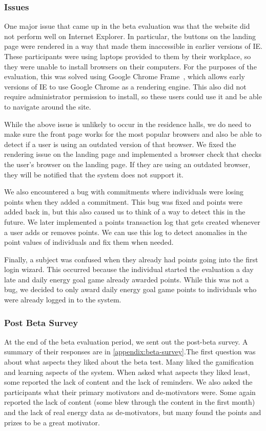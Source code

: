 \subsubsection{Issues}

One major issue that came up in the beta evaluation was that the website did not perform well on Internet Explorer. In particular, the buttons on the landing page were rendered in a way that made them inaccessible in earlier versions of IE. These participants were using laptops provided to them by their workplace, so they were unable to install browsers on their computers. For the purposes of the evaluation, this was solved using Google Chrome Frame~\cite{google-chrome-frame}, which allows early versions of IE to use Google Chrome as a rendering engine. This also did not require administrator permission to install, so these users could use it and be able to navigate around the site. 

While the above issue is unlikely to occur in the residence halls, we do need to make sure the front page works for the most popular browsers and also be able to detect if a user is using an outdated version of that browser. We fixed the rendering issue on the landing page and implemented a browser check that checks the user's browser on the landing page. If they are using an outdated browser, they will be notified that the system does not support it.

We also encountered a bug with commitments where individuals were losing points when they added a commitment. This bug was fixed and points were added back in, but this also caused us to think of a way to detect this in the future. We later implemented a points transaction log that gets created whenever a user adds or removes points. We can use this log to detect anomalies in the point values of individuals and fix them when needed.

Finally, a subject was confused when they already had points going into the first login wizard. This occurred because the individual started the evaluation a day late and daily energy goal game already awarded points. While this was not a bug, we decided to only award daily energy goal game points to individuals who were already logged in to the system.

\subsubsection{Post Beta Survey}

At the end of the beta evaluation period, we sent out the post-beta survey. A summary of their responses are in \autoref{appendix:beta-survey}.The first question was about what aspects they liked about the beta test. Many liked the gamification and learning aspects of the system. When asked what aspects they liked least, some reported the lack of content and the lack of reminders. We also asked the participants what their primary motivators and de-motivators were. Some again reported the lack of content (some blew through the content in the first month) and the lack of real energy data as de-motivators, but many found the points and prizes to be a great motivator.

